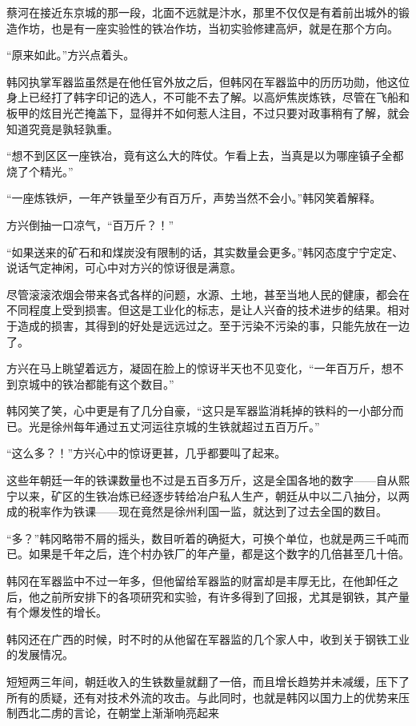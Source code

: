 蔡河在接近东京城的那一段，北面不远就是汴水，那里不仅仅是有着前出城外的锻造作坊，也是有一座实验性的铁冶作坊，当初实验修建高炉，就是在那个方向。

“原来如此。”方兴点着头。

韩冈执掌军器监虽然是在他任官外放之后，但韩冈在军器监中的历历功勋，他这位身上已经打了韩字印记的选人，不可能不去了解。以高炉焦炭炼铁，尽管在飞船和板甲的炫目光芒掩盖下，显得并不如何惹人注目，不过只要对政事稍有了解，就会知道究竟是孰轻孰重。

“想不到区区一座铁冶，竟有这么大的阵仗。乍看上去，当真是以为哪座镇子全都烧了个精光。”

“一座炼铁炉，一年产铁量至少有百万斤，声势当然不会小。”韩冈笑着解释。

方兴倒抽一口凉气，“百万斤？！”

“如果送来的矿石和和煤炭没有限制的话，其实数量会更多。”韩冈态度宁宁定定、说话气定神闲，可心中对方兴的惊讶很是满意。

尽管滚滚浓烟会带来各式各样的问题，水源、土地，甚至当地人民的健康，都会在不同程度上受到损害。但这是工业化的标志，是让人兴奋的技术进步的结果。相对于造成的损害，其得到的好处是远远过之。至于污染不污染的事，只能先放在一边了。

方兴在马上眺望着远方，凝固在脸上的惊讶半天也不见变化，“一年百万斤，想不到京城中的铁冶都能有这个数目。”

韩冈笑了笑，心中更是有了几分自豪，“这只是军器监消耗掉的铁料的一小部分而已。光是徐州每年通过五丈河运往京城的生铁就超过五百万斤。”

“这么多？！”方兴心中的惊讶更甚，几乎都要叫了起来。

这些年朝廷一年的铁课数量也不过是五百多万斤，这是全国各地的数字——自从熙宁以来，矿区的生铁冶炼已经逐步转给冶户私人生产，朝廷从中以二八抽分，以两成的税率作为铁课——现在竟然是徐州利国一监，就达到了过去全国的数目。

“多？”韩冈略带不屑的摇头，数目听着的确挺大，可换个单位，也就是两三千吨而已。如果是千年之后，连个村办铁厂的年产量，都是这个数字的几倍甚至几十倍。

韩冈在军器监中不过一年多，但他留给军器监的财富却是丰厚无比，在他卸任之后，他之前所安排下的各项研究和实验，有许多得到了回报，尤其是钢铁，其产量有个爆发性的增长。

韩冈还在广西的时候，时不时的从他留在军器监的几个家人中，收到关于钢铁工业的发展情况。

短短两三年间，朝廷收入的生铁数量就翻了一倍，而且增长趋势并未减缓，压下了所有的质疑，还有对技术外流的攻击。与此同时，也就是韩冈以国力上的优势来压制西北二虏的言论，在朝堂上渐渐响亮起来

